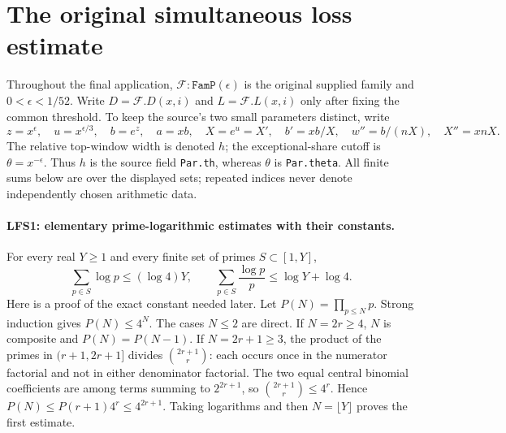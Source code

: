 \section{The original simultaneous loss estimate}
\label{sec:global-loss-v035}


Throughout the final application, $\mathcal F:\texttt{FamP}(\epsilon)$
is the original supplied family and $0<\epsilon<1/52$.  Write
$D=\mathcal F.D(x,i)$ and $L=\mathcal F.L(x,i)$ only after fixing the
common threshold.  To keep the source's two small parameters distinct,
write
\[
 z=x^\epsilon,\quad u=x^{\epsilon/3},\quad
 b=e^z,\quad a=xb,\quad X=e^u=X',\quad
 b'=xb/X,\quad w''=b/(nX),\quad X''=xnX.                 \tag{LFS.1}
\]
The relative top-window width is denoted $h$; the exceptional-share
cutoff is $\theta=x^{-\epsilon}$.  Thus $h$ is the source field
\texttt{Par.th}, whereas $\theta$ is \texttt{Par.theta}.
All finite sums below are over the displayed sets; repeated indices
never denote independently chosen arithmetic data.

\paragraph{LFS1: elementary prime-logarithmic estimates with their constants.}
\label{claim:LFS1}
For every real $Y\ge1$ and every finite set of primes $S\subset[1,Y]$,
\[
 \sum_{p\in S}\log p\le (\log4)Y,\qquad
 \sum_{p\in S}\frac{\log p}{p}\le\log Y+\log4.          \tag{LFS.2}
\]
Here is a proof of the exact constant needed later.  Let
$P(N)=\prod_{p\le N}p$.  Strong induction gives $P(N)\le4^N$.
The cases $N\le2$ are direct.  If $N=2r\ge4$, $N$ is composite and
$P(N)=P(N-1)$.  If $N=2r+1\ge3$, the product of the primes in
$(r+1,2r+1]$ divides $\binom{2r+1}{r}$: each occurs once in the
numerator factorial and not in either denominator factorial.
The two equal central binomial coefficients are among terms summing
to $2^{2r+1}$, so $\binom{2r+1}{r}\le4^r$.  Hence
$P(N)\le P(r+1)4^r\le4^{2r+1}$.  Taking logarithms and then
$N=\lfloor Y\rfloor$ proves the first estimate.

